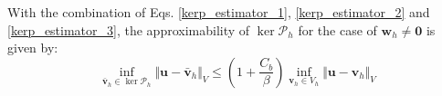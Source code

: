 With the combination of Eqs. \eqref{kerp_estimator_1}, \eqref{kerp_estimator_2} and \eqref{kerp_estimator_3}, the approximability of $\ker \mathcal P_h$ for the case of $\boldsymbol w_h \ne \boldsymbol 0$ is given by:
\begin{equation}
\inf_{\bar{\boldsymbol v}_h \in \ker \mathcal P_h}\Vert \boldsymbol u - \bar{\boldsymbol v}_h \Vert_V \le (1+\frac{C_b}{\beta}) \inf_{\boldsymbol v_h \in V_h} \Vert \boldsymbol u- \boldsymbol v_h \Vert_V
\end{equation}

